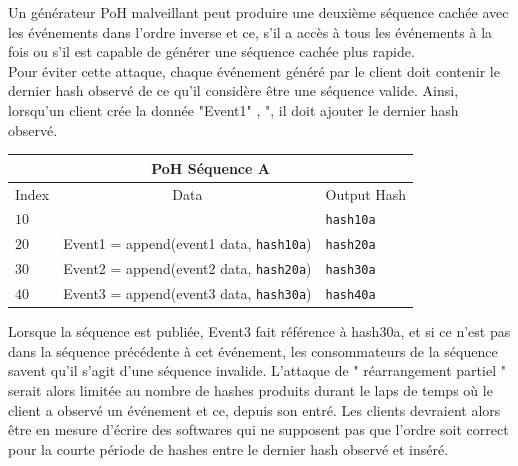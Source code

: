 \documentclass[12pt]{article}
\begin{document}
Un générateur PoH malveillant peut produire une deuxième séquence cachée avec les événements dans l'ordre inverse et ce, s’il a accès à tous les événements à la fois ou s’il est capable de générer une séquence cachée plus rapide.\\

Pour éviter cette attaque, chaque événement généré par le client doit contenir le dernier hash observé de ce qu'il considère être une séquence valide. Ainsi, lorsqu'un client crée la donnée "Event1" , ", il doit ajouter le dernier hash observé.\\

\begin{center}
  \begin{tabular}{  l  c l}

    \multicolumn{3}{c}{PoH Séquence A} \\
    \hline
    Index  & Data & Output Hash  \\ \hline
    $10$ & & \texttt{hash10a} \\
    $20$ & Event1 = append(event1 data, \texttt{hash10a}) & \texttt{hash20a}  \\
    $30$ & Event2 = append(event2 data, \texttt{hash20a}) & \texttt{hash30a} \\
    $40$ &  Event3 = append(event3 data, \texttt{hash30a}) & \texttt{hash40a} \\
    \end{tabular}
\end{center}

Lorsque la séquence est publiée, Event3 fait référence à hash30a, et si ce n'est pas dans la séquence précédente à cet événement, les consommateurs de la séquence savent qu'il s'agit d'une séquence invalide. L'attaque de " réarrangement partiel " serait alors limitée au nombre de hashes produits durant le laps de temps où le client a observé un événement et ce, depuis son entré. Les clients devraient alors être en mesure d'écrire des softwares qui ne supposent pas que l'ordre soit correct pour la courte période de hashes entre le dernier hash observé et inséré.
\end{document}
